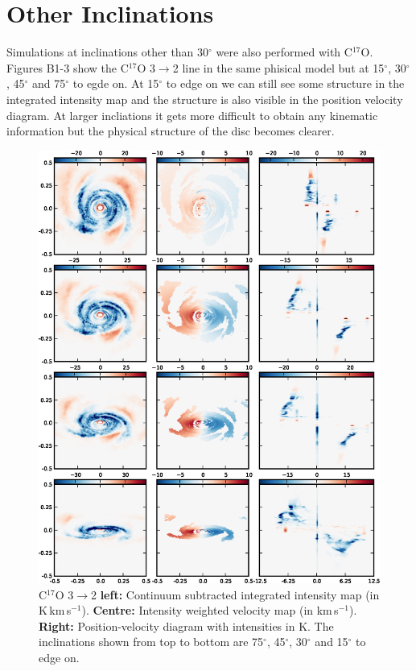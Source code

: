 \documentclass[useAMS,usenatbib]{mn2e}
\begin{document}
 


\appendix

\section{Other Inclinations} \label{sec:other_inc}

Simulations at inclinations other than 30$^\circ$ were also performed with C$^{17}$O. Figures B1-3 show the C$^{17}$O 3$\rightarrow$2 line in the same phisical model but at 15$^\circ$, 30$^\circ$, 45$^\circ$ and 75$^\circ$ to egde on. At 15$^\circ$ to edge on we can still see some structure in the integrated intensity map and the structure is also visible in the position velocity diagram. At larger incliations it gets more difficult to obtain any kinematic information but the physical structure of the disc becomes clearer.

\begin{figure}
 \includegraphics[width=164mm]{Figures/sim/appendix_inclinations2.eps}

 \caption{C$^{17}$O 3$\rightarrow$2 {\bf left:} Continuum subtracted integrated intensity map (in K$\,$km$\,$s$^{-1}$). {\bf Centre:} Intensity weighted velocity map (in km$\,$s$^{-1}$). {\bf Right:} Position-velocity diagram with intensities in K. The inclinations shown from top to bottom are 75$^\circ$, 45$^\circ$, 30$^\circ$ and 15$^\circ$ to edge on.}
\end{figure}
\end{document}
